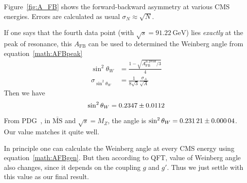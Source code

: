 Figure~\ref{fig:A_FB} shows the forward-backward asymmetry at various CMS energies. Errors are calculated as usual $\sigma_N \approx \sqrt{N}$.

If one says that the fourth data point (with $\sqrt{s} =\SI{91.22}{\giga\eV}$) lies \textit{exactly} at the peak of resonance, this $A_\text{FB}$ can be used to determined the Weinberg angle from equation~\ref{math:AFBpeak}
\begin{align*}
	\sin^2\theta_W &= \frac{1-\sqrt{A^{\mu, \text{peak}}_{\text{FB}}/3}}{4} \\
	\sigma_{\sin^2\theta_W} &= \frac{1}{8\sqrt{3}} \frac{\sigma_A}{\sqrt{A}}	
\end{align*}
Then we have
\begin{equation}
	\sin^2\theta_W = \num{0.2347 +- 0.0112}
\end{equation}

From PDG~\cite{PDG}, in $\bar{\text{MS}}$ and $\sqrt{s} = M_Z$, the angle is $\sin^2\theta_W = \num{0.23121 +- 0.00004}$. Our value matches it quite well.

In principle one can calculate the Weinberg angle at every CMS energy using equation~\ref{math:AFBgen}. But then according to QFT, value of Weinberg angle also changes, since it depends on the coupling $g$ and $g'$. Thus we just settle with this value as our final result.

